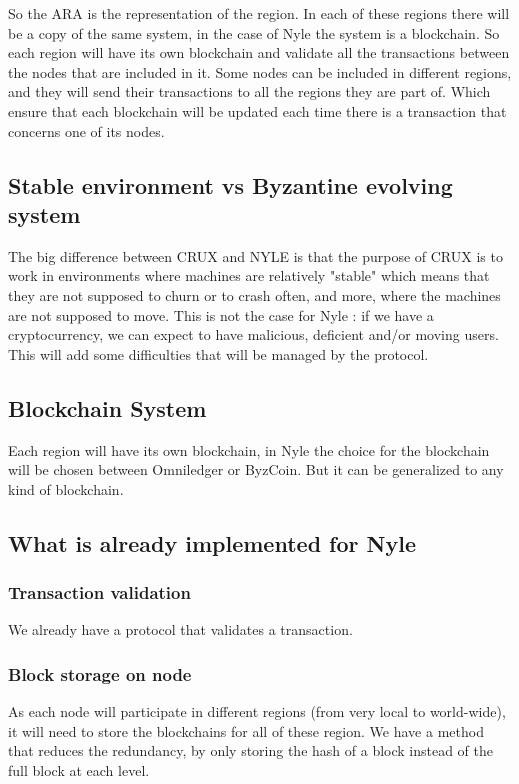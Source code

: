 \documentclass[a4paper,11pt,oneside]{report}
\begin{document}
So the ARA is the representation of the region. In each of these regions there
will be a copy of the same system, in the case of Nyle the system is a
blockchain. So each region will have its own blockchain and validate all the
transactions between the nodes that are included in it. Some nodes can be
included in different regions, and they will send their transactions to all the
regions they are part of. Which ensure that each blockchain will be updated
each time there is a transaction that concerns one of its nodes.

\subsection{Stable environment vs Byzantine evolving system}

The big difference between CRUX and NYLE is that the purpose of CRUX is to work
in environments where machines are relatively "stable" which means that they
are not supposed to churn or to crash often, and more, where the machines are
not supposed to move. This is not the case for Nyle : if we have a
cryptocurrency, we can expect to have malicious, deficient and/or moving users.
This will add some difficulties that will be managed by the protocol.

\subsection{Blockchain System} \label{blockchain_subsection}

Each region will have its own blockchain, in Nyle the choice for the blockchain
will be chosen between Omniledger or ByzCoin. But it can be generalized to any
kind of blockchain.

\subsection{What is already implemented for Nyle} \subsubsection{Transaction
validation} We already have a protocol that validates a transaction.

\subsubsection{Block storage on node} As each node will participate in
different regions (from very local to world-wide), it will need to store the
blockchains for all of these region. We have a method that reduces the
redundancy, by only storing the hash of a block instead of the full block at
each level. 
\end{document}
